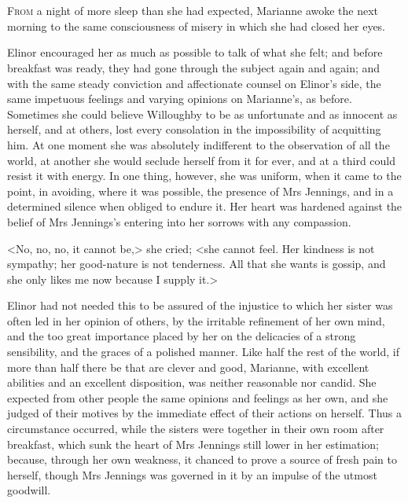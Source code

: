 \chapter[Chapter \thechapter]{}
\lettrine[lraise=0.3]{F}{rom} a night of more sleep than she had expected, Marianne awoke the next morning to the same consciousness of misery in which she had closed her eyes.

\zz
Elinor encouraged her as much as possible to talk of what she felt; and before breakfast was ready, they had gone through the subject again and again; and with the same steady conviction and affectionate counsel on Elinor's side, the same impetuous feelings and varying opinions on Marianne's, as before. Sometimes she could believe Willoughby to be as unfortunate and as innocent as herself, and at others, lost every consolation in the impossibility of acquitting him. At one moment she was absolutely indifferent to the observation of all the world, at another she would seclude herself from it for ever, and at a third could resist it with energy. In one thing, however, she was uniform, when it came to the point, in avoiding, where it was possible, the presence of Mrs Jennings, and in a determined silence when obliged to endure it. Her heart was hardened against the belief of Mrs Jennings's entering into her sorrows with any compassion.

<No, no, no, it cannot be,> she cried; <she cannot feel. Her kindness is not sympathy; her good-nature is not tenderness. All that she wants is gossip, and she only likes me now because I supply it.>

Elinor had not needed this to be assured of the injustice to which her sister was often led in her opinion of others, by the irritable refinement of her own mind, and the too great importance placed by her on the delicacies of a strong sensibility, and the graces of a polished manner. Like half the rest of the world, if more than half there be that are clever and good, Marianne, with excellent abilities and an excellent disposition, was neither reasonable nor candid. She expected from other people the same opinions and feelings as her own, and she judged of their motives by the immediate effect of their actions on herself. Thus a circumstance occurred, while the sisters were together in their own room after breakfast, which sunk the heart of Mrs Jennings still lower in her estimation; because, through her own weakness, it chanced to prove a source of fresh pain to herself, though Mrs Jennings was governed in it by an impulse of the utmost goodwill.

